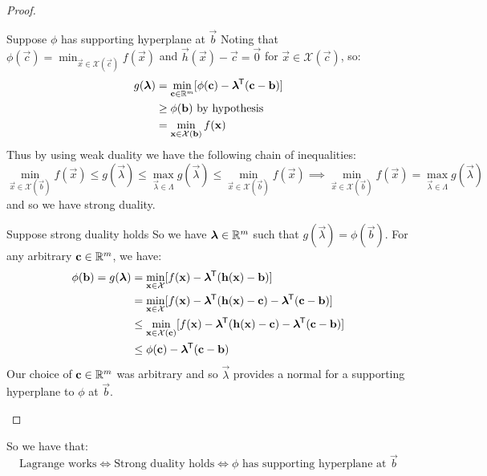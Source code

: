 \documentclass[../main.tex]{subfiles}
\begin{document}
\begin{proof}
\begin{proofdirection}{Suppose $\phi$ has supporting hyperplane at $\vec{b}$}
    Noting that $\phi(\vec{c}) = \min_{\vec{x} \in \mathcal{X}(\vec{c})} f(\vec{x})$ and $\vec{h}(\vec{x}) - \vec{c} = \vec{0}$ for $\vec{x} \in \mathcal{X}(\vec{c})$, so:
    \begin{align*}
      g(\mathbf{\bm{\lambda}}) &= \min_{\mathbf{\bm{c}} \in \mathbb{R}^{m}} [\phi(\mathbf{\bm{c}}) - \mathbf{\bm{\lambda}}^{{\mkern-1.5mu\mathsf{T}}}(\mathbf{\bm{c}} - \mathbf{\bm{b}})] \\
                       &\geq \phi(\mathbf{\bm{b}}) \text{ by hypothesis} \\
                       &= \min_{\mathbf{\bm{x}} \in \mathcal{X}(\mathbf{\bm{b}})} f(\mathbf{\bm{x}})
    \end{align*}
    Thus by using weak duality we have the following chain of inequalities:
    \[
      \min_{\vec{x} \in \mathcal{X}(\vec{b})} f(\vec{x}) \leq g(\vec{\lambda}) \leq \max_{\vec{\lambda} \in \Lambda} g(\vec{\lambda}) \leq \min_{\vec{x} \in \mathcal{X}(\vec{b})} f(\vec{x}) \implies \min_{\vec{x} \in \mathcal{X}(\vec{b})} f(\vec{x}) = \max_{\vec{\lambda} \in \Lambda} g(\vec{\lambda})
    \]
    and so we have strong duality.
  \end{proofdirection}
  \begin{proofdirection}{Suppose strong duality holds}
    So we have $\mathbf{\bm{\lambda}} \in \mathbb{R}^{m}$ such that $g(\vec{\lambda}) = \phi(\vec{b})$.
    For any arbitrary $\mathbf{\bm{c}} \in \mathbb{R}^{m}$, we have:
    \begin{align*}
      \phi(\mathbf{\bm{b}}) = g(\mathbf{\bm{\lambda}}) &= \min_{\mathbf{\bm{x}} \in \mathcal{X}} [f(\mathbf{\bm{x}}) - \mathbf{\bm{\lambda}}^{{\mkern-1.5mu\mathsf{T}}} (\mathbf{\bm{h}}(\mathbf{\bm{x}}) - \mathbf{\bm{b}})] \\
                                       &= \min_{\mathbf{\bm{x}} \in \mathcal{X}} [f(\mathbf{\bm{x}}) - \mathbf{\bm{\lambda}}^{{\mkern-1.5mu\mathsf{T}}}(\mathbf{\bm{h}}(\mathbf{\bm{x}}) - \mathbf{\bm{c}}) - \mathbf{\bm{\lambda}}^{{\mkern-1.5mu\mathsf{T}}}(\mathbf{\bm{c}} - \mathbf{\bm{b}})] \\
                                       &\leq \min_{\mathbf{\bm{x}} \in \mathcal{X}(\mathbf{\bm{c}})} [f(\mathbf{\bm{x}}) - \mathbf{\bm{\lambda}}^{{\mkern-1.5mu\mathsf{T}}}(\mathbf{\bm{h}}(\mathbf{\bm{x}}) - \mathbf{\bm{c}}) - \mathbf{\bm{\lambda}}^{{\mkern-1.5mu\mathsf{T}}}(\mathbf{\bm{c}} - \mathbf{\bm{b}})] \\
                                       &\leq \phi(\mathbf{\bm{c}}) - \mathbf{\bm{\lambda}}^{{\mkern-1.5mu\mathsf{T}}}(\mathbf{\bm{c}} - \mathbf{\bm{b}})
    \end{align*}
    Our choice of $\mathbf{\bm{c}} \in \mathbb{R}^{m}$ was arbitrary and so $\vec{\lambda}$ provides a normal for a supporting hyperplane to $\phi$ at $\vec{b}$.
  \end{proofdirection}
\end{proof}
So we have that:
\[
  \text{Lagrange works} \iff \text{Strong duality holds} \iff \phi \text{ has supporting hyperplane at $\vec{b}$}
\]
\end{document}
